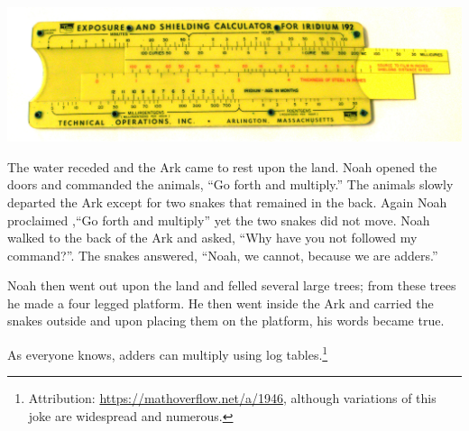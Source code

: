 \begin{center}
  \includegraphics[width=\textwidth]{sliderule}
\end{center}

\begin{jk}
  The water receded and the Ark came to rest upon the land. Noah opened the doors and commanded the
  animals, ``Go forth and multiply.'' The animals slowly departed the Ark except for two snakes that
  remained in the back. Again Noah proclaimed ,``Go forth and multiply'' yet the two snakes did not move.
  Noah walked to the back of the Ark and asked, ``Why have you not followed my command?''. The snakes
  answered, ``Noah, we cannot, because we are adders.''

  Noah then went out upon the land and felled several large trees; from these trees he made a four legged
  platform. He then went inside the Ark and carried the snakes outside and upon placing them on the platform,
  his words became true.

  As everyone knows, adders can multiply using log tables.\footnote{Attribution: \url{https://mathoverflow.net/a/1946}, although
  variations of this joke are widespread and numerous.}
\end{jk}

